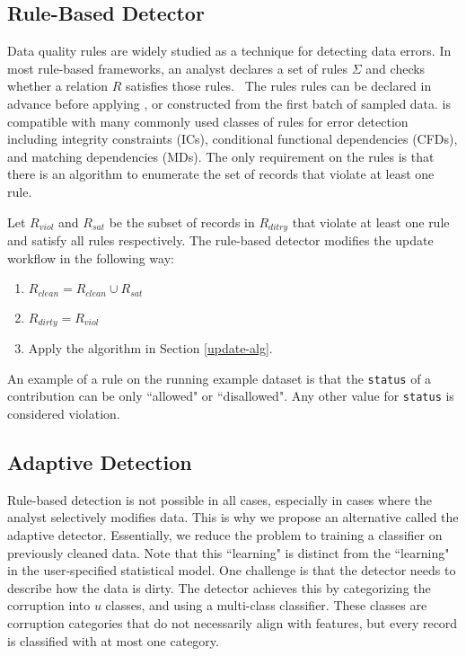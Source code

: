 \subsection{Rule-Based Detector}\label{rule-det}
Data quality rules are widely studied as a technique for detecting data errors.
In most rule-based frameworks, an analyst declares a set of rules $\Sigma$ and checks whether a relation $R$ satisfies those rules.  The rules rules can be declared in advance before applying \sys, or constructed from the first batch of sampled data.
\sys is compatible with many commonly used classes of rules for error detection including integrity constraints (ICs), conditional functional dependencies (CFDs), and matching dependencies (MDs).
The only requirement on the rules is that there is an algorithm to enumerate the set of records that violate at least one rule.

Let $R_{viol}$ and $R_{sat}$ be the subset of records in $R_{ditry}$ that violate at least one rule and satisfy all rules respectively.
The rule-based detector modifies the update workflow in the following way:
\begin{enumerate}
\item $R_{clean} = R_{clean} \cup R_{sat}$
\item $R_{dirty} = R_{viol}$
\item Apply the algorithm in Section \ref{update-alg}.
\end{enumerate}

\vspace{0.5em}

\begin{example}\label{detex1}
An example of a rule on the running example dataset is that the \texttt{status} of
a contribution can be only ``allowed" or ``disallowed".
Any other value for \texttt{status} is considered violation.
\end{example}

\subsection{Adaptive Detection}
Rule-based detection is not possible in all cases, especially in cases where the analyst selectively modifies data.
This is why we propose an alternative called the adaptive detector.
Essentially, we reduce the problem to training a classifier on previously cleaned data.
Note that this ``learning" is distinct from the ``learning" in the user-specified statistical model.
One challenge is that the detector needs to describe how the data is dirty.
The detector achieves this by categorizing the corruption into $u$ classes, and using a multi-class classifier.
These classes are corruption categories that do not necessarily align with features, but every record is classified with at most one category.

